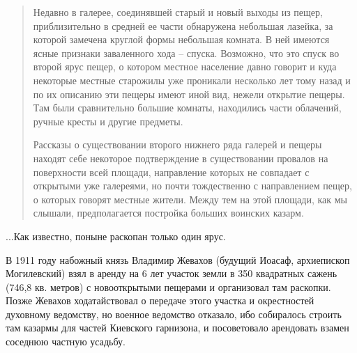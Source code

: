\begin{quotation}
Недавно в галерее, соединявшей старый и новый выходы из пещер, приблизительно в средней ее части обнаружена небольшая лазейка, за которой замечена круглой формы небольшая комната. В ней имеются ясные признаки заваленного хода – спуска. Возможно, что это спуск во второй ярус пещер, о котором местное население давно говорит и куда некоторые местные старожилы уже проникали несколько лет тому назад и по их описанию эти пещеры имеют иной вид, нежели открытие пещеры. Там были сравнительно большие комнаты, находились части облачений, ручные кресты и другие предметы.

Рассказы о существовании второго нижнего ряда галерей и пещеры находят себе некоторое подтверждение в существовании провалов на поверхности всей площади, направление которых не совпадает с открытыми уже галереями, но почти тождественно с направлением пещер, о которых говорят местные жители. Между тем на этой площади, как мы слышали, предполагается постройка больших воинских казарм.
\end{quotation}

...Как известно, поныне раскопан только один ярус.

В 1911 году набожный князь Владимир Жевахов (будущий Иоасаф, архиепископ Могилевский) взял в аренду на 6 лет участок земли в 350 квадратных сажень (746,8 кв. метров) с новооткрытыми пещерами и организовал там раскопки. Позже Жевахов ходатайствовал о передаче этого участка и окрестностей духовному ведомству, но военное ведомство отказало, ибо собиралось строить там казармы для частей Киевского гарнизона, и посоветовало арендовать взамен соседнюю частную усадьбу.

